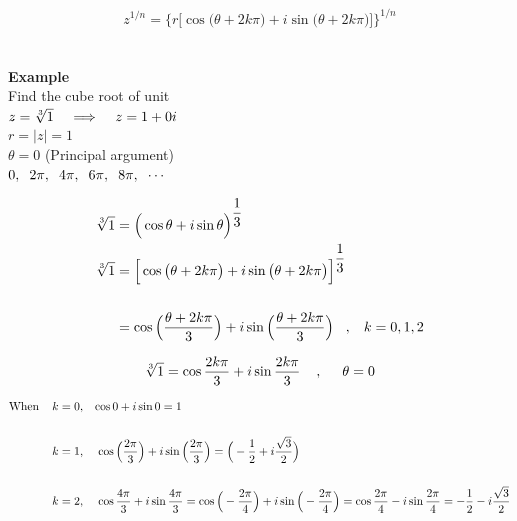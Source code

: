 \documentclass[11pt,a4paper]{article}
\begin{document}
$$ z^{1/n} = \Big\{r\big[\cos \big(\theta + 2k\pi\big) + i \sin \big( \theta + 2k \pi\big) \big]\Big\}^{1/n}$$\\\\




\textbf{Example}\\
Find the cube root of unit\\

$z = \sqrt[3]{1}\hspace{0.3cm} \implies\hspace{0.3cm} z = 1 + 0 i$\\

$r = |z| = 1$\\

$\theta = 0$ (Principal argument)\\
$0, \hspace{0.2cm} 2\pi,\hspace{0.2cm} 4\pi, \hspace{0.2cm} 6\pi,\hspace{0.2cm} 8\pi, \hspace{0.2cm} \cdots$

\begin{align*}
\sqrt[3]{1} & = \Big(\cos \theta + i\sin \theta\Big)^{\dfrac{1}{3}}\\
\sqrt[3]{1} & = \Big[\cos \big(\theta + 2k\pi\big) + i \sin \big( \theta + 2k \pi\big)\Big]^{\dfrac{1}{3}}\\\\
& = \cos \Big(\dfrac{\theta + 2k\pi}{3}\Big) + i \sin\Big(\dfrac{\theta + 2k\pi}{3}\Big) \hspace{0.3cm}, \hspace{0.3cm} k = 0, 1,2
\end{align*}


$$\sqrt[3]{1} =  \cos \dfrac{2k\pi}{3} + i \sin\dfrac{2k\pi}{3} \hspace{0.4cm}, \hspace{0.5cm} \theta = 0$$


\begin{align*}
\text{When}\hspace{0.4cm} k = 0, & \hspace{0.3cm} \cos 0 + i\sin 0 = 1\\\\
k = 1, & \hspace{0.4cm} \cos \Big(\dfrac{2\pi}{3}\Big) + i\sin \Big(\dfrac{2\pi}{3}\Big) = \Big(-\dfrac{1}{2} + i\dfrac{\sqrt{3}}{2}\Big)\\\\
k = 2, & \hspace{0.4cm} \cos \dfrac{4\pi}{3} + i\sin \dfrac{4\pi}{3}  = \cos \Big(-\dfrac{2\pi}{4}\Big) + i\sin \Big(-\dfrac{2\pi}{4}\Big) =\cos\dfrac{2\pi}{4} - i\sin \dfrac{2\pi}{4} = -\dfrac{1}{2} - i\dfrac{\sqrt{3}}{2}
\end{align*}
\end{document}
